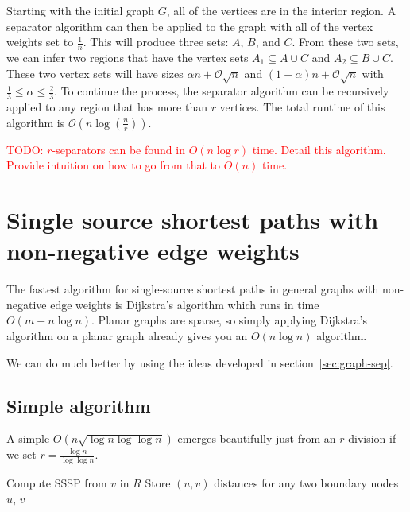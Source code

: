 \documentclass[12pt]{article}
\begin{document}
    Starting with the initial graph $G$, all of the vertices are in the interior region. A separator algorithm can then be applied to the graph with all of the vertex weights set to $\frac{1}{n}$. This will produce three sets: $A$, $B$, and $C$. From these two sets, we can infer two regions that have the vertex sets $A_1 \subseteq A \cup C$ and $A_2 \subseteq B \cup C$. These two vertex sets will have sizes $\alpha n + \mathcal{O}\sqrt{n}$ and $(1 - \alpha) n + \mathcal{O}\sqrt{n}$ with $\frac{1}{3} \leq \alpha \leq \frac{2}{3}$. To continue the process, the separator algorithm can be recursively applied to any region that has more than $r$ vertices. The total runtime of this algorithm is $\mathcal{O} \left (n \log \left (\frac{n}{r} \right ) \right )$.

\textcolor{red}{TODO: $r$-separators can be found in $O(n\log r)$ time. Detail this algorithm. Provide intuition on how to go from that to $O(n)$ time.}

\section{Single source shortest paths with non-negative edge weights}
\label{sec:nonn-edge-weights}

The fastest algorithm for single-source shortest paths in general graphs with non-negative edge weights is Dijkstra's algorithm which runs in time $O(m + n\log n)$. Planar graphs are sparse, so simply applying Dijkstra's algorithm on a planar graph already gives you an $O(n \log n)$ algorithm.

We can do much better by using the ideas developed in section~\ref{sec:graph-sep}.

\subsection{Simple algorithm}
\label{sec:simple-algorithm}

A simple $O(n\sqrt{\log n \log \log n})$ emerges beautifully just from an $r$-division if we set $r = \frac{\log n}{\log \log n}$.

\begin{algorithm}[!htb]
  \label{alg:sssp-region}
  \begin{algorithmic}
        \State Compute SSSP from $v$ in $R$
        \State Store $(u,v)$ distances for any two boundary nodes $u$, $v$
      \EndFor
    \EndFor
  \end{algorithmic}
\end{algorithm}
\end{document}
